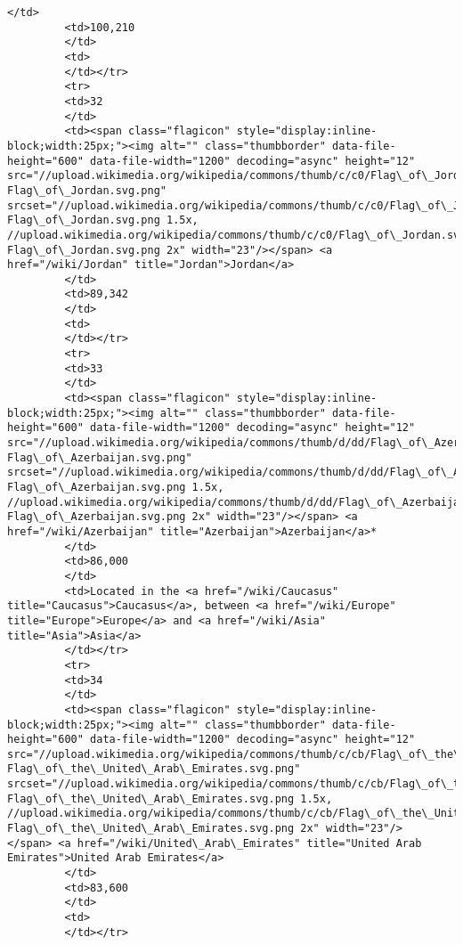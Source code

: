 \documentclass[11pt]{article}
\begin{document}
\begin{Verbatim}[commandchars=\\\{\}]
         </td>
         <td>100,210
         </td>
         <td>
         </td></tr>
         <tr>
         <td>32
         </td>
         <td><span class="flagicon" style="display:inline-block;width:25px;"><img alt="" class="thumbborder" data-file-height="600" data-file-width="1200" decoding="async" height="12" src="//upload.wikimedia.org/wikipedia/commons/thumb/c/c0/Flag\_of\_Jordan.svg/23px-Flag\_of\_Jordan.svg.png" srcset="//upload.wikimedia.org/wikipedia/commons/thumb/c/c0/Flag\_of\_Jordan.svg/35px-Flag\_of\_Jordan.svg.png 1.5x, //upload.wikimedia.org/wikipedia/commons/thumb/c/c0/Flag\_of\_Jordan.svg/46px-Flag\_of\_Jordan.svg.png 2x" width="23"/></span> <a href="/wiki/Jordan" title="Jordan">Jordan</a>
         </td>
         <td>89,342
         </td>
         <td>
         </td></tr>
         <tr>
         <td>33
         </td>
         <td><span class="flagicon" style="display:inline-block;width:25px;"><img alt="" class="thumbborder" data-file-height="600" data-file-width="1200" decoding="async" height="12" src="//upload.wikimedia.org/wikipedia/commons/thumb/d/dd/Flag\_of\_Azerbaijan.svg/23px-Flag\_of\_Azerbaijan.svg.png" srcset="//upload.wikimedia.org/wikipedia/commons/thumb/d/dd/Flag\_of\_Azerbaijan.svg/35px-Flag\_of\_Azerbaijan.svg.png 1.5x, //upload.wikimedia.org/wikipedia/commons/thumb/d/dd/Flag\_of\_Azerbaijan.svg/46px-Flag\_of\_Azerbaijan.svg.png 2x" width="23"/></span> <a href="/wiki/Azerbaijan" title="Azerbaijan">Azerbaijan</a>*
         </td>
         <td>86,000
         </td>
         <td>Located in the <a href="/wiki/Caucasus" title="Caucasus">Caucasus</a>, between <a href="/wiki/Europe" title="Europe">Europe</a> and <a href="/wiki/Asia" title="Asia">Asia</a>
         </td></tr>
         <tr>
         <td>34
         </td>
         <td><span class="flagicon" style="display:inline-block;width:25px;"><img alt="" class="thumbborder" data-file-height="600" data-file-width="1200" decoding="async" height="12" src="//upload.wikimedia.org/wikipedia/commons/thumb/c/cb/Flag\_of\_the\_United\_Arab\_Emirates.svg/23px-Flag\_of\_the\_United\_Arab\_Emirates.svg.png" srcset="//upload.wikimedia.org/wikipedia/commons/thumb/c/cb/Flag\_of\_the\_United\_Arab\_Emirates.svg/35px-Flag\_of\_the\_United\_Arab\_Emirates.svg.png 1.5x, //upload.wikimedia.org/wikipedia/commons/thumb/c/cb/Flag\_of\_the\_United\_Arab\_Emirates.svg/46px-Flag\_of\_the\_United\_Arab\_Emirates.svg.png 2x" width="23"/></span> <a href="/wiki/United\_Arab\_Emirates" title="United Arab Emirates">United Arab Emirates</a>
         </td>
         <td>83,600
         </td>
         <td>
         </td></tr>

\end{Verbatim}
\end{document}
